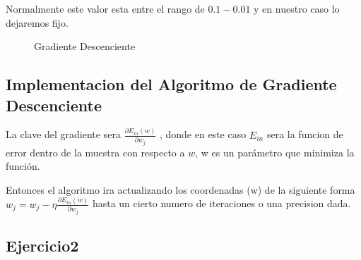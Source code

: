 Normalmente este valor esta entre el rango de $ 0.1 - 0.01$ y en nuestro caso lo dejaremos fijo.
\newpage
\begin{figure}
  \centering
  \caption{Gradiente Descenciente}
  \label{f:Pruebas_gradiente}
 \end{figure}


 
 
\subsection{Implementacion del Algoritmo de Gradiente Descenciente}

La clave del gradiente sera $ \frac{\partial E_{in}(w)}{\partial w_j}$ , donde en este caso $E_{in}$ sera la funcion de error dentro de la muestra 
con respecto a $w$, w es un parámetro que minimiza la función. 

Entonces el algoritmo ira actualizando los coordenadas (w) de la siguiente forma\newline
$ w_j = w_j - \eta \frac{\partial E_{in}(w)}{\partial w_j}$ hasta un cierto numero de iteraciones o una precision dada.



\subsection{Ejercicio2}
